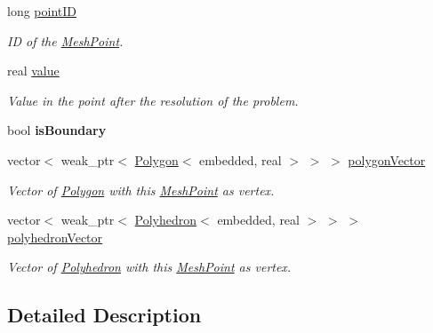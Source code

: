 \begin{DoxyCompactItemize}
\item 
long \hyperlink{class_mesh_point_a474d09b4818c37c554f2d89a86da4d10}{point\+ID}\hypertarget{class_mesh_point_a474d09b4818c37c554f2d89a86da4d10}{}\label{class_mesh_point_a474d09b4818c37c554f2d89a86da4d10}

\begin{DoxyCompactList}\small\item\em ID of the \hyperlink{class_mesh_point}{Mesh\+Point}. \end{DoxyCompactList}\item 
real \hyperlink{class_mesh_point_a6b519968ffd55e29a8486e30d46a9517}{value}\hypertarget{class_mesh_point_a6b519968ffd55e29a8486e30d46a9517}{}\label{class_mesh_point_a6b519968ffd55e29a8486e30d46a9517}

\begin{DoxyCompactList}\small\item\em Value in the point after the resolution of the problem. \end{DoxyCompactList}\item 
bool {\bfseries is\+Boundary}\hypertarget{class_mesh_point_ab42a8a9014ed3fe6e3623dd2ef305c8d}{}\label{class_mesh_point_ab42a8a9014ed3fe6e3623dd2ef305c8d}

\item 
vector$<$ weak\+\_\+ptr$<$ \hyperlink{class_polygon}{Polygon}$<$ embedded, real $>$ $>$ $>$ \hyperlink{class_mesh_point_a114d5fed31c8ca38751e66ebf9a6648a}{polygon\+Vector}
\begin{DoxyCompactList}\small\item\em Vector of \hyperlink{class_polygon}{Polygon} with this \hyperlink{class_mesh_point}{Mesh\+Point} as vertex. \end{DoxyCompactList}\item 
vector$<$ weak\+\_\+ptr$<$ \hyperlink{class_polyhedron}{Polyhedron}$<$ embedded, real $>$ $>$ $>$ \hyperlink{class_mesh_point_a675c54208346d021ad9a90e382f9c1d3}{polyhedron\+Vector}
\begin{DoxyCompactList}\small\item\em Vector of \hyperlink{class_polyhedron}{Polyhedron} with this \hyperlink{class_mesh_point}{Mesh\+Point} as vertex. \end{DoxyCompactList}\end{DoxyCompactItemize}


\subsection{Detailed Description}
